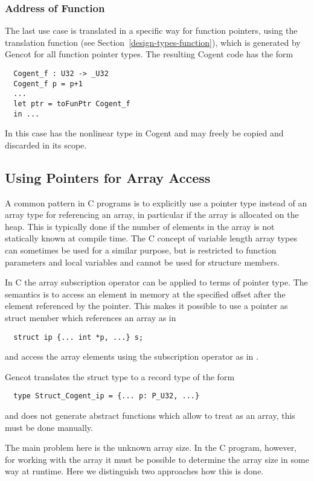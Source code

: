 \subsubsection{Address of Function}

The last use case is translated in a specific way for function pointers, using the translation function
 (see Section~\ref{design-types-function}), which is generated by Gencot for all function
pointer types. The resulting Cogent code has the form
\begin{verbatim}
  Cogent_f : U32 -> _U32
  Cogent_f p = p+1
  ...
  let ptr = toFunPtr Cogent_f
  in ...
\end{verbatim}
In this case  has the nonlinear type  in Cogent and may freely be copied and
discarded in its scope.

\subsection{Using Pointers for Array Access}
\label{app-trans-arrpoint}

A common pattern in C programs is to explicitly use a pointer type instead of an array type for referencing an array,
in particular if the array is allocated on the heap. This is typically done if the number of elements in the
array is not statically known at compile time. The C concept of variable length array types can sometimes be
used for a similar purpose, but is restricted to function parameters and local variables and cannot be used for
structure members.

In C the array subscription operator can be applied to terms of pointer type. The semantics is to access an element 
in memory at the specified offset after the element referenced by the pointer. This makes it possible to use 
a pointer as struct member which references an array as in
\begin{verbatim}
  struct ip {... int *p, ...} s;
\end{verbatim}
and access the array elements using the subscription operator as in .

Gencot translates the struct type to a record type of the form
\begin{verbatim}
  type Struct_Cogent_ip = {... p: P_U32, ...}
\end{verbatim}
and does not generate abstract functions which allow to treat  as an array, this must be done manually.

The main problem here is the unknown array size. In the C program, however, for working with the array it must be
possible to determine the array size in some way at runtime. Here we distinguish two approaches how this is done.

